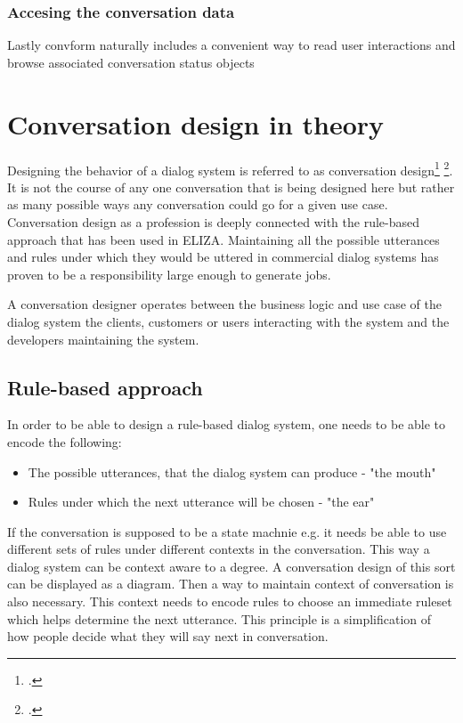 \documentclass[12pt]{report}
\begin{document}
{\subsubsection{Accesing the conversation data}
Lastly convform naturally includes a convenient way to read user interactions
and browse associated conversation status objects

\section{Conversation design in theory}

\par
Designing the behavior of a dialog system
is referred to as conversation design\footcite{kolosova2022} \footcite{mctear2020conversational}.
It is not the course of any one conversation that is being designed here
but rather as many possible ways any conversation could go
for a given use case.
Conversation design as a profession is deeply connected
with the rule-based approach that has been used in ELIZA.
Maintaining all the possible utterances and
rules under which they would be uttered
in commercial dialog systems
has proven to be a responsibility large enough
to generate jobs.

A conversation designer operates between
the business logic and use case of the dialog system
the clients, customers or users interacting with the system
and the developers maintaining the system.

\subsection{Rule-based approach}

In order to be able to design a rule-based dialog system,
one needs to be able to encode the following:

    \begin{itemize}

        \item
        The possible utterances, that the dialog system can produce - "the mouth"

        \item
        Rules under which the next utterance will be chosen - "the ear"

    \end{itemize}

\par
If the conversation is supposed to be a state machnie e.g.
it needs be able to use different sets of rules
under different contexts in the conversation.
This way a dialog system can be context aware to a degree.
A conversation design of this sort
can be displayed as a diagram.
Then a way to maintain context of conversation is also necessary.
This context needs to encode rules to choose an immediate ruleset
which helps determine the next utterance.
This principle is a simplification of
how people decide what they will say next in conversation.

}
\end{document}
